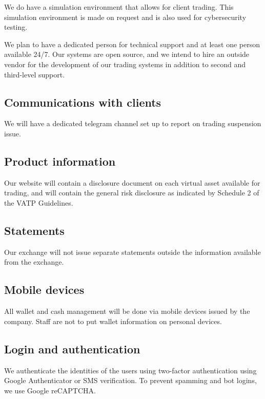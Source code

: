 We do have a simulation environment that allows for client
trading.  This simulation environment is made on request and is also
used for cybersecurity testing.

We plan to have a dedicated person for technical support and at least
one person available 24/7.  Our systems are open source, and we intend
to hire an outside vendor for the development of our trading systems in
addition to second and third-level support.

\subsection{Communications with clients}
We will have a dedicated telegram channel set up to report on trading
suspension issue.

\subsection{Product information}
Our website will contain a disclosure document on each virtual asset
available for trading, and will contain the general risk disclosure
as indicated by Schedule 2 of the VATP Guidelines.

\subsection{Statements}
Our exchange will not issue separate statements outside the information available from the exchange.

\subsection{Mobile devices}
All wallet and cash management will be done via mobile devices issued
by the company.  Staff are not to put wallet information on personal
devices.

\subsection{Login and authentication}

We authenticate the identities of the users using two-factor
authentication using Google Authenticator or SMS verification.  To prevent spamming and bot logins, we use Google reCAPTCHA.

